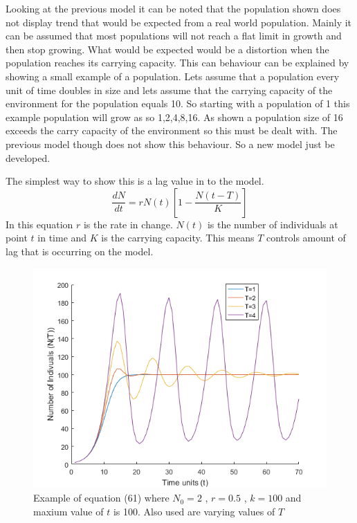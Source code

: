 \documentclass[final]{cmpreport}
\begin{document}
	
		Looking at the previous model it can be noted that the population shown does not display trend that would be expected from a real world population. Mainly it can be  assumed that most populations will not reach a flat limit in growth and then stop growing. What would be expected would be a distortion when the population reaches its carrying capacity. This can behaviour can be explained by showing a small example of a population. Lets assume that a population every unit of time doubles in size and lets assume that the carrying capacity of the environment for the population equals 10. So starting with a population of 1 this example population will grow as so 1,2,4,8,16. As shown a population size of 16 exceeds the carry capacity of the environment so this must be dealt with. The previous model though does not show this behaviour. So a new  model just be developed.
	
		The simplest way to show this is a lag value in to the model.   
		\begin{equation}
		 \frac{dN}{dt}=rN(t)[1-\frac{N(t-T)}{K}] 
		\end{equation}
		In this equation $r$ is the rate in change. $N(t)$ is the number of individuals at point $t$ in time and $K$ is the carrying capacity. This means $T$ controls amount of lag that is occurring on the model.

		
		\begin{figure}[h!] 
			\includegraphics[width=\textwidth]{HutishingsonModel.png}
			\caption{Example of equation (61) where $N_0 = 2$ , $r=0.5$ , $k=100$ and maxium value of $t$ is 100. Also used are varying values of $T$}  
		\end{figure}
		
\end{document}
